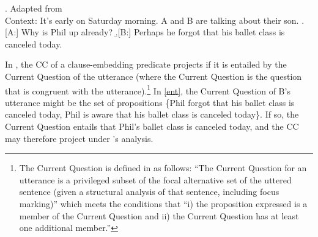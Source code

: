 \documentclass[a4paper,12pt,twoside]{article}
\newcommand{\poscite}[1]{\citeauthor{#1}'s \citeyear{#1}}
\begin{document}
\ex.\label{ent} Adapted from \citealt[188]{simons_best_2017} \\ Context: It's early on Saturday morning. A and B are talking about their son. 
\a.[A:] Why is Phil up already?
\b.[B:] Perhaps he forgot that his ballet class is canceled today. 

In \citealt{simons_best_2017}, the CC of a clause-embedding predicate projects if it is entailed by the Current Question of the utterance (where the Current Question is the question that is congruent with the utterance).\footnote{The Current Question is defined in \citealt[194]{simons_best_2017} as follows: ``The Current Question for an utterance is a privileged subset of the focal alternative set of the uttered sentence (given a structural analysis of that sentence, including focus marking)'' which meets the conditions that ``i) the proposition expressed is a member of the Current Question and ii) the Current Question has at least one additional member.''} In \ref{ent},  the Current Question of B's utterance might be the set of propositions \{Phil forgot that his ballet class is canceled today, Phil is aware that his ballet class is canceled today\}. If so, the Current Question entails that Phil's ballet class is canceled today, and the CC may therefore project under \poscite{simons_best_2017} analysis.

		
\end{document}
